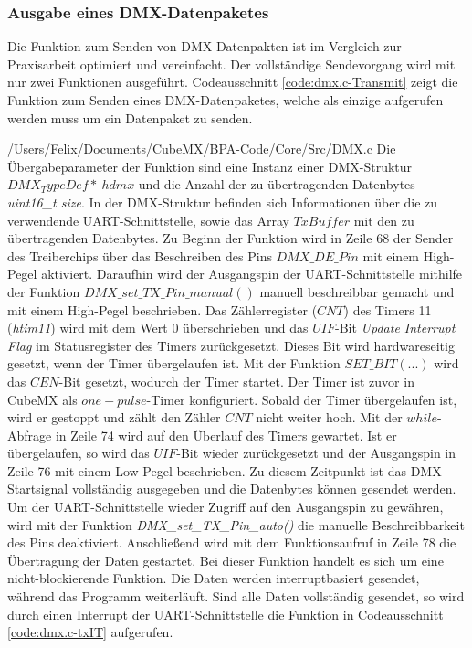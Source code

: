 \subsubsection{Ausgabe eines DMX-Datenpaketes}
Die Funktion zum Senden von DMX-Datenpakten ist im Vergleich zur Praxisarbeit optimiert und vereinfacht. Der vollständige Sendevorgang wird mit nur zwei Funktionen ausgeführt. Codeausschnitt \ref{code:dmx.c-Transmit} zeigt die Funktion zum Senden eines DMX-Datenpaketes, welche als einzige aufgerufen werden muss um ein Datenpaket zu senden.

{/Users/Felix/Documents/CubeMX/BPA-Code/Core/Src/DMX.c}
Die Übergabeparameter der Funktion sind eine Instanz einer DMX-Struktur $DMX_TypeDef*\ hdmx$ und die Anzahl der zu übertragenden Datenbytes \textit{uint16\_t size}. In der DMX-Struktur befinden sich Informationen über die zu verwendende UART-Schnittstelle, %
sowie das Array $TxBuffer$ mit den zu übertragenden Datenbytes. Zu Beginn der Funktion wird in Zeile 68 der Sender des Treiberchips über das Beschreiben des Pins $DMX\_DE\_Pin$ mit einem High-Pegel aktiviert. Daraufhin wird der Ausgangspin der UART-Schnittstelle mithilfe der Funktion $DMX\_set\_TX\_Pin\_manual()$ manuell beschreibbar gemacht und mit einem High-Pegel beschrieben.
Das Zählerregister ($CNT$) des Timers 11 (\textit{htim11}) wird mit dem Wert 0 überschrieben und das $UIF$-Bit \textit{Update Interrupt Flag} im Statusregister des Timers zurückgesetzt. Dieses Bit wird hardwareseitig gesetzt, wenn der Timer übergelaufen ist. Mit der Funktion $SET\_BIT(...)$ wird das $CEN$-Bit gesetzt, wodurch der Timer startet. Der Timer ist zuvor in CubeMX als $one-pulse$-Timer konfiguriert. Sobald der Timer übergelaufen ist, wird er gestoppt und zählt den Zähler $CNT$ nicht weiter hoch. Mit der $while$-Abfrage in Zeile 74 wird auf den Überlauf des Timers gewartet. Ist er übergelaufen, so wird das $UIF$-Bit wieder zurückgesetzt und der Ausgangspin in Zeile 76 mit einem Low-Pegel beschrieben. Zu diesem Zeitpunkt ist das DMX-Startsignal vollständig ausgegeben und die Datenbytes können gesendet werden. Um der UART-Schnittstelle wieder Zugriff auf den Ausgangspin zu gewähren, wird mit der Funktion \textit{DMX\_set\_TX\_Pin\_auto()} die manuelle Beschreibbarkeit des Pins deaktiviert. Anschließend wird mit dem Funktionsaufruf in Zeile 78 die Übertragung der Daten gestartet. Bei dieser Funktion handelt es sich um eine nicht-blockierende Funktion. Die Daten werden interruptbasiert gesendet, während das Programm weiterläuft. Sind alle Daten vollständig gesendet, so wird durch einen Interrupt der UART-Schnittstelle die Funktion in Codeausschnitt \ref{code:dmx.c-txIT} aufgerufen.

